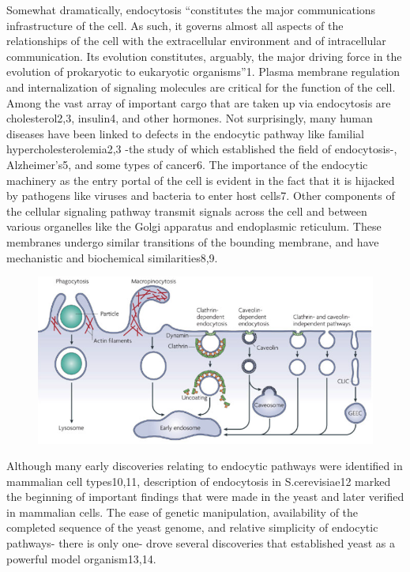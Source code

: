 \vspace{5mm}
Somewhat dramatically, endocytosis “constitutes the major communications infrastructure of the cell. As such, it governs almost all aspects of the relationships of the cell with the extracellular environment and of intracellular communication. Its evolution constitutes, arguably, the major driving force in the evolution of prokaryotic to eukaryotic organisms”1.  Plasma membrane regulation and internalization of signaling molecules are critical for the function of the cell. Among the vast array of important cargo that are taken up via endocytosis are cholesterol2,3, insulin4, and other hormones. Not surprisingly, many human diseases have been linked to defects in the endocytic pathway like familial hypercholesterolemia2,3 -the study of which established the field of endocytosis-, Alzheimer’s5, and some types of cancer6. The importance of the endocytic machinery as the entry portal of the cell is evident in the fact that it is hijacked by pathogens like viruses and bacteria to enter host cells7. Other components of the cellular signaling pathway transmit signals across the cell and between various organelles like the Golgi apparatus and endoplasmic reticulum. These membranes undergo similar transitions of the bounding membrane, and have mechanistic and biochemical similarities8,9. 

\begin{figure}[H]
\centering
\includegraphics[scale=0.4]{figures/intro/fig2_screenshot}
\end{figure}

Although many early discoveries relating to endocytic pathways were identified in mammalian cell types10,11, description of endocytosis in S.cerevisiae12 marked the beginning of important findings that were made in the yeast and later verified in mammalian cells. The ease of genetic manipulation, availability of the completed sequence of the yeast genome, and relative simplicity of endocytic pathways- there is only one- drove several discoveries that established yeast as a powerful model organism13,14.



